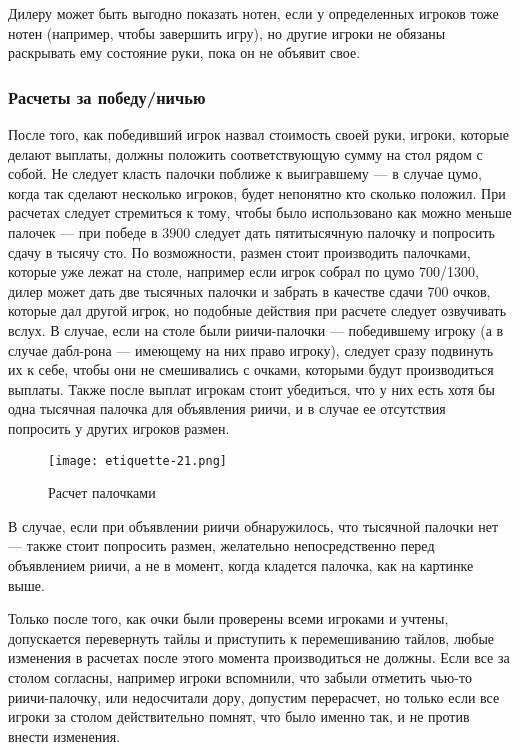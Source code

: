 Дилеру может быть выгодно показать нотен, если у определенных игроков тоже нотен (например, чтобы завершить игру), но другие игроки не обязаны раскрывать ему состояние руки, пока он не объявит свое.

\subsubsection{Расчеты за победу/ничью}

После того, как победивший игрок назвал стоимость своей руки, игроки, которые делают выплаты, должны положить соответствующую сумму на стол рядом с собой. Не следует класть палочки поближе к выигравшему --- в случае цумо, когда так сделают несколько игроков, будет непонятно кто сколько положил. При расчетах следует стремиться к тому, чтобы было использовано как можно меньше палочек --- при победе в 3900 следует дать пятитысячную палочку и попросить сдачу в тысячу сто. По возможности, размен стоит производить палочками, которые уже лежат на столе, например если игрок собрал по цумо 700/1300, дилер может дать две тысячных палочки и забрать в качестве сдачи 700 очков, которые дал другой игрок, но подобные действия при расчете следует озвучивать вслух. В случае, если на столе были риичи-палочки --- победившему игроку (а в случае дабл-рона --- имеющему на них право игроку), следует сразу подвинуть их к себе, чтобы они не смешивались с очками, которыми будут производиться выплаты. Также после выплат игрокам стоит убедиться, что у них есть хотя бы одна тысячная палочка для объявления риичи, и в случае ее отсутствия попросить у других игроков размен.

\begin{figure}[H]
	\centering
	\texttt{[image: etiquette-21.png]}
	\caption{Расчет палочками}
\end{figure}

В случае, если при объявлении риичи обнаружилось, что тысячной палочки нет --- также стоит попросить размен, желательно непосредственно перед объявлением риичи, а не в момент, когда кладется палочка, как на картинке выше.

Только после того, как очки были проверены всеми игроками и учтены, допускается перевернуть тайлы и приступить к перемешиванию тайлов, любые изменения в расчетах после этого момента производиться не должны. Если все за столом согласны, например игроки вспомнили, что забыли отметить чью-то риичи-палочку, или недосчитали дору, допустим перерасчет, но только если все игроки за столом действительно помнят, что было именно так, и не против внести изменения.

